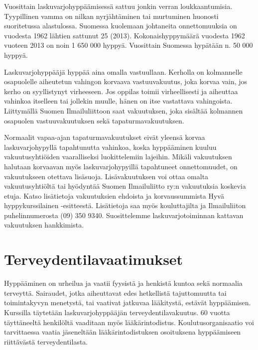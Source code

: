 Vuosittain laskuvarjohyppäämisessä sattuu jonkin verran loukkaantumisia. Tyypillinen vamma on nilkan nyrjähtäminen tai murtuminen huonosti suoritetussa alastulossa. Suomessa kuolemaan johtaneita onnettomuuksia on vuodesta 1962 lähtien sattunut 25 (2013). Kokonaishyppymäärä vuodesta 1962 vuoteen 2013 on noin 1 650 000 hyppyä. Vuosittain Suomessa hypätään n. 50 000 hyppyä. 


Laskuvarjohyppääjä hyppää aina omalla vastuullaan. Kerholla on kolmannelle osapuolelle aiheutetun vahingon korvaava vastuuvakuutus, joka korvaa vain, jos kerho on syyllistynyt virheeseen. Jos oppilas toimii virheellisesti ja aiheuttaa vahinkoa itselleen tai jollekin muulle, hänen on itse vastattava vahingoista. Liittymällä Suomen Ilmailuliittoon saat vakuutuksen, joka sisältää kolmannen osapuolen vastuuvakuutuksen sekä tapaturmavakuutuksen. 


Normaalit vapaa-ajan tapaturmavakuutukset eivät yleensä korvaa laskuvarjohypyllä tapahtunutta vahinkoa, koska hyppääminen kuuluu vakuutusyhtiöiden vaaralliseksi luokittelemiin lajeihin. Mikäli vakuutuksen halutaan korvaavan myös laskuvarjohypyillä tapahtuneet onnettomuudet, on vakuutukseen otettava lisäsuoja.  Lisävakuutuksen voi ottaa omalta vakuutusyhtiöltä tai hyödyntää Suomen Ilmailuliitto ry:n vakuutuksia koskevia etuja. Katso lisätietoja vakuutuksien ehdoista ja korvaussummista Hyvä hyppykurssilainen -esitteestä. Lisätietoja saa myös kouluttajilta ja Ilmailuliiton puhelinnumerosta (09) 350 9340. Suosittelemme laskuvarjotoiminnan kattavan vakuutuksen hankkimista. 

\section{ Terveydentilavaatimukset }
\label{tervetuloa-taivaalle-terveydentilavaatimukset}


Hyppääminen on urheilua ja vaatii fyysistä ja henkistä kuntoa sekä normaalia terveyttä. Sairaudet, jotka aiheuttavat edes hetkellistä tajuttomuutta tai toimintakyvyn menetystä, tai vaativat jatkuvaa lääkitystä, estävät hyppäämisen. Kurssilla täytetään laskuvarjohyppääjän terveydentilavakuutus. 60 vuotta täyttäneeltä henkilöltä vaaditaan myös lääkärintodistus. Koulutusorganisaatio voi tarvittaessa vaatia jäseneltään lääkärintodistuksen osoituksena hyppäämiseen riittävästä terveydentilasta. 

